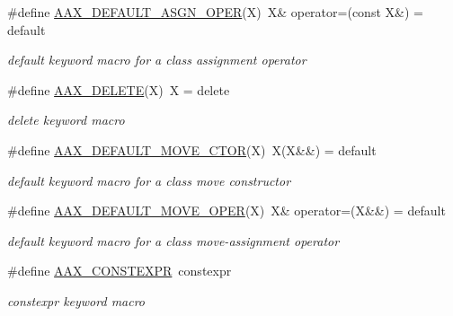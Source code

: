 \begin{Indent}
\begin{DoxyCompactItemize}
\#define \mbox{\hyperlink{a00392_aded8c9ff9a00f3780ae99be88573a5ce}{A\+A\+X\+\_\+\+D\+E\+F\+A\+U\+L\+T\+\_\+\+A\+S\+G\+N\+\_\+\+O\+P\+ER}}(X)~X\& operator=(const X\&) = default
\begin{DoxyCompactList}\small\item\em {\ttfamily default} keyword macro for a class assignment operator \end{DoxyCompactList}\item 
\#define \mbox{\hyperlink{a00392_a2511e9b022e49caf594bca6fa6bff74c}{A\+A\+X\+\_\+\+D\+E\+L\+E\+TE}}(X)~X = delete
\begin{DoxyCompactList}\small\item\em {\ttfamily delete} keyword macro \end{DoxyCompactList}\item 
\#define \mbox{\hyperlink{a00392_a25bcd6f9d38bd2c9ffbf8aff01b4a274}{A\+A\+X\+\_\+\+D\+E\+F\+A\+U\+L\+T\+\_\+\+M\+O\+V\+E\+\_\+\+C\+T\+OR}}(X)~X(X\&\&) = default
\begin{DoxyCompactList}\small\item\em {\ttfamily default} keyword macro for a class move constructor \end{DoxyCompactList}\item 
\#define \mbox{\hyperlink{a00392_a0478af896a79eddf2ddee1cfd403e6b0}{A\+A\+X\+\_\+\+D\+E\+F\+A\+U\+L\+T\+\_\+\+M\+O\+V\+E\+\_\+\+O\+P\+ER}}(X)~X\& operator=(X\&\&) = default
\begin{DoxyCompactList}\small\item\em {\ttfamily default} keyword macro for a class move-\/assignment operator \end{DoxyCompactList}\item 
\#define \mbox{\hyperlink{a00392_aa7cfdcabcfd72ca9b829e6cea9ea6470}{A\+A\+X\+\_\+\+C\+O\+N\+S\+T\+E\+X\+PR}}~constexpr
\begin{DoxyCompactList}\small\item\em {\ttfamily constexpr} keyword macro \end{DoxyCompactList}\end{DoxyCompactItemize}
\end{Indent}
